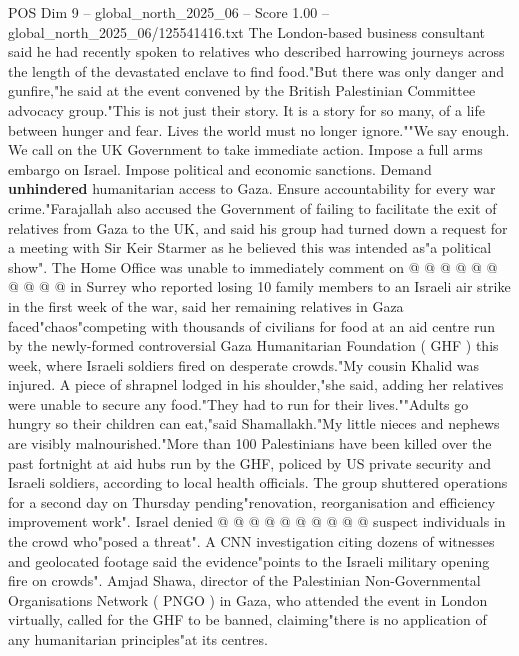 \begin{textsample}{POS Dim 9 – global\_north\_2025\_06 – Score 1.00 – global\_north\_2025\_06/125541416.txt}  \label{ex:f9_pos_380}
The London-based business consultant said he had recently spoken to relatives who described harrowing journeys across the length of the devastated enclave to find food."But there was only danger and gunfire,"he said at the event convened by the British Palestinian Committee advocacy group."This is not just their story.
It is a story for so many, of a life between hunger and fear.
Lives the world must no longer ignore.""We say enough.
We call on the UK Government to take immediate action.
Impose a full arms embargo on Israel.
Impose political and economic sanctions.
Demand \textbf{unhindered} humanitarian access to Gaza.
Ensure accountability for every war crime."Farajallah also accused the Government of failing to facilitate the exit of relatives from Gaza to the UK, and said his group had turned down a request for a meeting with Sir Keir Starmer as he believed this was intended as"a political show".
The Home Office was unable to immediately comment on @ @ @ @ @ @ @ @ @ @ in Surrey who reported losing 10 family members to an Israeli air strike in the first week of the war, said her remaining relatives in Gaza faced"chaos"competing with thousands of civilians for food at an aid centre run by the newly-formed controversial Gaza Humanitarian Foundation ( GHF ) this week, where Israeli soldiers fired on desperate crowds."My cousin Khalid was injured.
A piece of shrapnel lodged in his shoulder,"she said, adding her relatives were unable to secure any food."They had to run for their lives.""Adults go hungry so their children can eat,"said Shamallakh."My little nieces and nephews are visibly malnourished."More than 100 Palestinians have been killed over the past fortnight at aid hubs run by the GHF, policed by US private security and Israeli soldiers, according to local health officials.
The group shuttered operations for a second day on Thursday pending"renovation, reorganisation and efficiency improvement work".
Israel denied @ @ @ @ @ @ @ @ @ @ suspect individuals in the crowd who"posed a threat".
A CNN investigation citing dozens of witnesses and geolocated footage said the evidence"points to the Israeli military opening fire on crowds".
Amjad Shawa, director of the Palestinian Non-Governmental Organisations Network ( PNGO ) in Gaza, who attended the event in London virtually, called for the GHF to be banned, claiming"there is no application of any humanitarian principles"at its centres.

\end{textsample}
